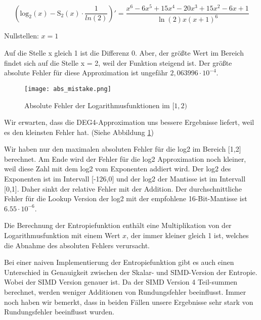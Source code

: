 \begin{equation*}
    (\mathrm{log_{2}}(x) - \mathrm{S_{2}}(x) \cdot \frac{1}{ln(2)})'
    = \dfrac{x^6-6x^5+15x^4-20x^3+15x^2-6x+1}{\ln\left(2\right)x\left(x+1\right)^6}
\end{equation*} \par

Nullstellen: $x = 1$ \par

Auf die Stelle x gleich 1 ist die Differenz 0. Aber, der größte Wert im Bereich findet sich auf die Stelle x = 2, weil der Funktion steigend ist. Der größte absolute Fehler für diese Approximation ist ungefähr $2,063996 \cdot 10^{-4}$.

\begin{figure}[h]
  \centering
  \texttt{[image: abs\_mistake.png]}
  \caption{Absolute Fehler der Logarithmusfunktionen im $[1,2)$}
    \label{fig:absolute-mistake}
\end{figure}

Wir erwarten, dass die DEG4-Approximation uns bessere Ergebnisse liefert, weil es den kleinsten Fehler hat. (Siehe Abbildung \ref{fig:absolute-mistake})

Wir haben nur den maximalen absoluten Fehler für die log2 im Bereich [1,2] berechnet. Am Ende wird der Fehler für die log2 Approximation noch kleiner, weil diese Zahl mit dem log2 vom Exponenten addiert wird. Der log2 des Exponenten ist im Intervall [-126,0] und der log2 der Mantisse ist im Intervall [0,1]. Daher sinkt der relative Fehler mit der Addition. Der durchschnittliche Fehler für die Lookup Version der log2 mit der empfohlene 16-Bit-Mantisse ist $6.55 \cdot 10^{-6}$.~\cite{fast_log}


Die Berechnung der Entropiefunktion enthält eine Multiplikation von der Logarithmusfunktion mit einem Wert $x$, der immer kleiner gleich 1 ist, welches die Abnahme des absoluten Fehlers verursacht.

Bei einer naiven Implementierung der Entropiefunktion gibt es auch einen Unterschied in Genauigkeit zwischen der Skalar- und SIMD-Version der Entropie. Wobei der SIMD Version genauer ist. Da der SIMD Version 4 Teil-summen berechnet, werden weniger Additionen von Rundungsfehler beeinflusst. Immer noch haben wir bemerkt, dass in beiden Fällen unsere Ergebnisse sehr stark von Rundungsfehler beeinflusst wurden.


